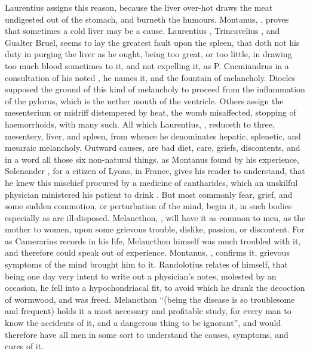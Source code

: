 Laurentius assigns this reason, because the liver over-hot draws the meat
undigested out of the stomach, and burneth the humours. Montanus,
, proves that sometimes a cold liver may be a
cause. Laurentius , Trincavelius
, and Gualter Bruel, seems to lay the
greatest fault upon the spleen, that doth not his duty in purging the liver as
he ought, being too great, or too little, in drawing too much blood sometimes
to it, and not expelling it, as P. Cnemiandrus in a
consultation of his noted , he names
it, and the fountain of melancholy. Diocles supposed the ground of this kind of
melancholy to proceed from the inflammation of the pylorus, which is the nether
mouth of the ventricle. Others assign the mesenterium or midriff distempered by
heat, the womb misaffected, stopping of haemorrhoids, with many such. All which
Laurentius, , reduceth to three, mesentery,
liver, and spleen, from whence he denominates hepatic, splenetic, and mesaraic
melancholy. Outward causes, are bad diet, care, griefs, discontents, and in a
word all those six non-natural things, as Montanus found by his experience,
 Solenander , for a citizen of Lyons, in France, gives his reader to understand, that he
knew this mischief procured by a medicine of cantharides, which an unskilful
physician ministered his patient to drink . But most
commonly fear, grief, and some sudden commotion, or perturbation of the mind,
begin it, in such bodies especially as are ill-disposed. Melancthon,
, will have it as common to
men, as the mother to women, upon some grievous trouble, dislike, passion, or
discontent. For as Camerarius records in his life, Melancthon himself was much
troubled with it, and therefore could speak out of experience. Montanus,
, confirms it,
grievous symptoms of the mind brought him to it.
Randolotius relates of himself, that being one day very intent to write out a
physician's notes, molested by an occasion, he fell into a hypochondriacal fit,
to avoid which he drank the decoction of wormwood, and was freed.
Melancthon \enquote{(being the disease is so troublesome and
frequent) holds it a most necessary and profitable study, for every man to know
the accidents of it, and a dangerous thing to be ignorant}, and would therefore
have all men in some sort to understand the causes, symptoms, and cures of it.

